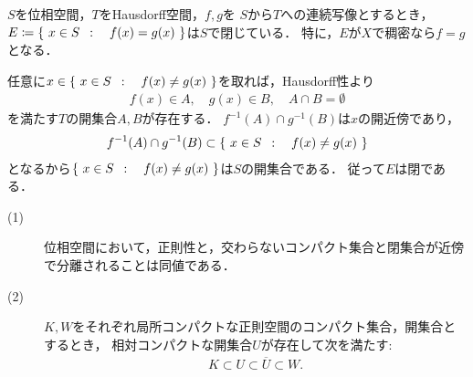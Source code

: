 	\begin{screen}
		\begin{thm}[Hausdorff空間値連続写像の等価域は閉]
			$S$を位相空間，$T$をHausdorff空間，$f,g$を
			$S$から$T$への連続写像とするとき，$E \coloneqq \left\{\ x \in S\ \, : \quad f(x) = g(x)\ \right\}$は$S$で閉じている．
			特に，$E$が$X$で稠密なら$f=g$となる．
		\end{thm}
	\end{screen}
	
	\begin{prf}
		任意に$x \in \left\{\ x \in S\ \, : \quad f(x) \neq g(x)\ \right\}$を取れば，Hausdorff性より
		\begin{align}
			f(x) \in A,\quad g(x) \in B,\quad A \cap B = \emptyset
		\end{align}
		を満たす$T$の開集合$A,B$が存在する．
		$f^{-1}(A) \cap g^{-1}(B)$は$x$の開近傍であり，
		\begin{align}
			f^{-1}(A) \cap g^{-1}(B) \subset \left\{\ x \in S\ \, : \quad f(x) \neq g(x)\ \right\}
		\end{align}
		となるから$\left\{\ x \in S\ \, : \quad f(x) \neq g(x)\ \right\}$は$S$の開集合である．
		従って$E$は閉である．
		\QED
	\end{prf}
	
	\begin{screen}
		\begin{thm}[正則空間とは交わらないコンパクト集合と閉集合が近傍で分離される空間]
		\label{thm:each_point_in_regular_space_has_closesd_local_base}\mbox{}
			\begin{description}
				\item[(1)] 位相空間において，正則性と，交わらないコンパクト集合と閉集合が近傍で分離されることは同値である．
					
				\item[(2)]
					$K,W$をそれぞれ局所コンパクトな正則空間のコンパクト集合，開集合とするとき，
					相対コンパクトな開集合$U$が存在して次を満たす:
					\begin{align}
						K \subset U \subset \overline{U} \subset W.
						\label{eq:thm_each_point_in_regular_space_has_closesd_local_base}
					\end{align}
			\end{description}
		\end{thm}
	\end{screen}
	

